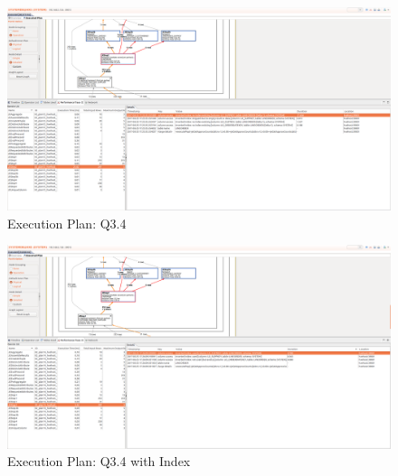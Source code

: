 \begin{landscape}
	\begin{figure}[H]
		\centering
		\includegraphics[scale=0.28]{images/execCol.png}
		\caption{Execution Plan: Q3.4}\label{execution-plan:before-index}
	\end{figure}
\end{landscape}
\begin{landscape}
	\begin{figure}[H]
		\centering
		\includegraphics[scale=0.28]{images/execColIndex.png}
		\caption{Execution Plan: Q3.4 with Index}\label{execution-plan:after-index}
	\end{figure}
\end{landscape}
